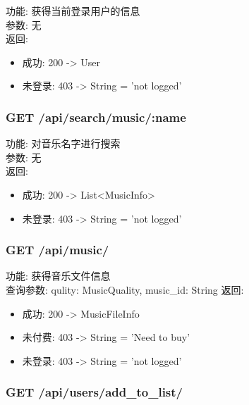 \begin{enumerate}
\noindent
功能: 获得当前登录用户的信息\\
参数: 无\\
返回:
\begin{itemize}
	\item 成功:  200 -> User
	\item 未登录:  403 -> String = 'not logged'
\end{itemize}


\subsubsection{GET /api/search/music/:name}

\noindent
功能: 对音乐名字进行搜索\\
参数: 无\\
返回:
\begin{itemize}
	\item 成功:  200 -> List<MusicInfo>
	\item 未登录:  403 -> String = 'not logged'
\end{itemize}


\subsubsection{GET /api/music/}

\noindent
功能: 获得音乐文件信息\\
查询参数: qulity: MusicQuality, music\_id: String
返回:
\begin{itemize}
	\item 成功:  200 -> MusicFileInfo
	\item 未付费:  403 -> String = 'Need to buy'
	\item 未登录:  403 -> String = 'not logged'
\end{itemize}


\subsubsection{GET /api/users/add\_to\_list/}


\end{enumerate}
